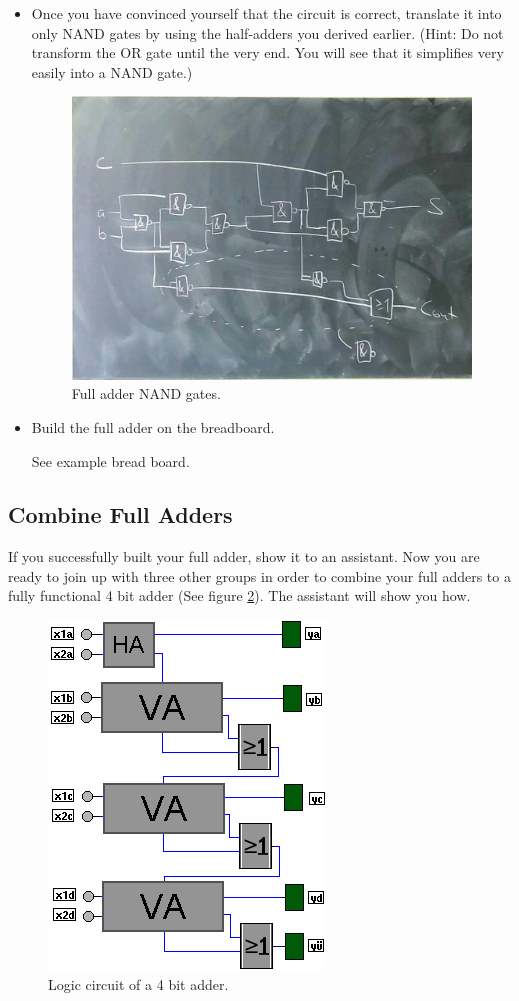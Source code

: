 \documentclass[10pt,a4paper]{article}
\begin{document}
\begin{itemize}
		\item Once you have convinced yourself that the circuit is correct, translate it into only NAND gates by using the half-adders you derived earlier. (Hint: Do not transform the OR gate until the very end. You will see that it simplifies very easily into a NAND gate.)
		\begin{figure}[H]
			\centering		  
			\includegraphics[scale=0.3]{full_nand_adder}
			\caption{Full adder NAND gates.}
			\label{fig:full-adder}
		\end{figure}
		\item Build the full adder on the breadboard.
		\begin{center}
			See example bread board.
		\end{center}
	\end{itemize}

\subsection{Combine Full Adders}
If you successfully built your full adder, show it to an assistant. Now you are ready to join up with three other groups in order to combine your full adders to a fully functional 4 bit adder (See figure \ref{fig:4bit}). The assistant will show you how.
\begin{figure}[H]
	\centering		  
	\includegraphics[scale=0.3]{4bit.png}
	\caption{Logic circuit of a 4 bit adder.}
	\label{fig:4bit}
\end{figure}
\end{document}
